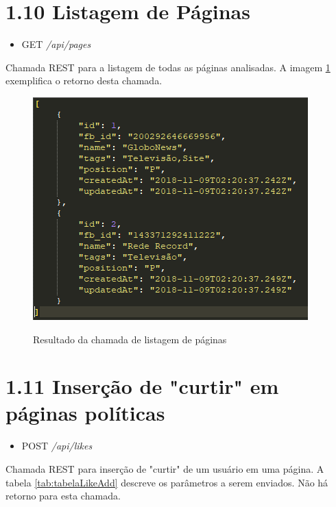 \documentclass[
	12pt,				%
	oneside,			%
	a4paper,			%
	english,			%
	brazil				%
	]{abntex2ppgsi}
\begin{document}
\begin{apendicesenv}
\section*{1.10 Listagem de Páginas}

\begin{itemize}
	\item {GET} \textit{/api/pages}
\end{itemize}

Chamada REST para a listagem de todas as páginas analisadas. A imagem \ref{fig:retornoPages} exemplifica o retorno desta chamada.

\begin{figure}[H]
	\centering
	\caption{Resultado da chamada de listagem de páginas}
	\includegraphics[scale=1]{resultadoPages.png}
	\label{fig:retornoPages}
\end{figure}

\section*{1.11 Inserção de "curtir" em páginas políticas}

\begin{itemize}
	\item {POST} \textit{/api/likes}
\end{itemize}

Chamada REST para inserção de "curtir" de um usuário em uma página. A tabela \ref{tab:tabelaLikeAdd} descreve os parâmetros a serem enviados. Não há retorno para esta chamada.


\end{apendicesenv}
\end{document}
